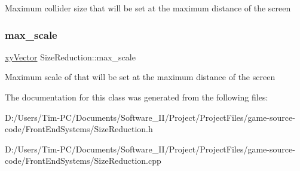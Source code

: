 Maximum collider size that will be set at the maximum distance of the screen \mbox{\label{class_size_reduction_a99ace47c7794d51e539712a3c2bc8642}} 
\subsubsection{\texorpdfstring{max\+\_\+scale}{max\_scale}}
{\footnotesize\ttfamily \hyperlink{structxy_vector}{xy\+Vector} Size\+Reduction\+::max\+\_\+scale\hspace{0.3cm}{\ttfamily [private]}}

Maximum scale of that will be set at the maximum distance of the screen 

The documentation for this class was generated from the following files\+:\begin{DoxyCompactItemize}
\item 
D\+:/\+Users/\+Tim-\/\+P\+C/\+Documents/\+Software\+\_\+\+I\+I/\+Project/\+Project\+Files/game-\/source-\/code/\+Front\+End\+Systems/Size\+Reduction.\+h\item 
D\+:/\+Users/\+Tim-\/\+P\+C/\+Documents/\+Software\+\_\+\+I\+I/\+Project/\+Project\+Files/game-\/source-\/code/\+Front\+End\+Systems/Size\+Reduction.\+cpp\end{DoxyCompactItemize}
